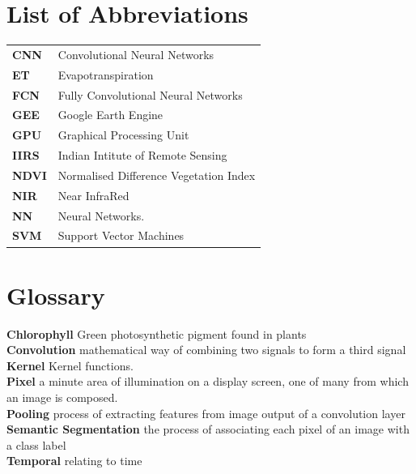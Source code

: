 \documentclass[12pt, a4paper]{report}
\begin{document}
\setcounter{secnumdepth}{0}
\section*{List of Abbreviations}
\vspace*{0.5cm}
\begin{tabular}{p{} p{}}
\textbf{CNN} & Convolutional Neural Networks\\
\textbf{ET} & Evapotranspiration\\
\textbf{FCN} & Fully Convolutional Neural Networks\\
\textbf{GEE} & Google Earth Engine\\
\textbf{GPU} & Graphical Processing Unit\\
\textbf{IIRS} & Indian Intitute of Remote Sensing\\
\textbf{NDVI} & Normalised Difference Vegetation Index\\
\textbf{NIR} & Near InfraRed\\
\textbf{NN} & Neural Networks.\\
\textbf{SVM} & Support Vector Machines\\
\end{tabular}
\vspace*{1cm}

\section*{Glossary}
\vspace*{0.5cm}
\textbf{Chlorophyll} Green photosynthetic pigment found in plants\\
\textbf{Convolution} mathematical way of combining two signals to form a third signal\\
\textbf{Kernel} Kernel functions.\\
\textbf{Pixel} a minute area of illumination on a display screen, one of many from which an image is composed.\\
\textbf{Pooling} process of extracting features from image output of a convolution layer\\
\textbf{Semantic Segmentation} the process of associating each pixel of an image with a class label\\
\textbf{Temporal} relating to time\\
\end{document}
